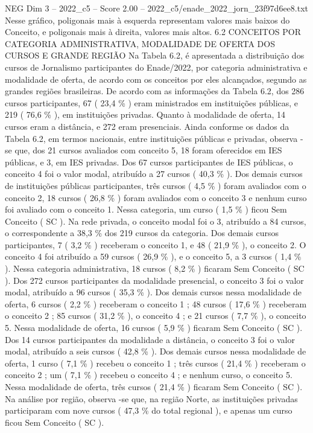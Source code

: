\begin{textsample}{NEG Dim 3 – 2022\_c5 – Score 2.00 – 2022\_c5/enade\_2022\_jorn\_23f97d6ee8.txt}
Nesse gráfico, poligonais mais à esquerda representam valores mais baixos do Conceito, e poligonais mais à direita, valores mais altos. 6.2 CONCEITOS POR CATEGORIA ADMINISTRATIVA, MODALIDADE DE OFERTA DOS CURSOS E GRANDE REGIÃO Na Tabela 6.2, é apresentada a distribuição dos cursos de Jornalismo participantes do Enade/2022, por categoria administrativa e modalidade de oferta, de acordo com os conceitos por eles alcançados, segundo as grandes regiões brasileiras.
De acordo com as informações da Tabela 6.2, dos 286 cursos participantes, 67 ( 23,4 \% ) eram ministrados em instituições públicas, e 219 ( 76,6 \% ), em instituições privadas.
Quanto à modalidade de oferta, 14 cursos eram a distância, e 272 eram presenciais.
Ainda conforme os dados da Tabela 6.2, em termos nacionais, entre instituições públicas e privadas, observa -se que, dos 21 cursos avaliados com conceito 5, 18 foram oferecidos em IES públicas, e 3, em IES privadas.
Dos 67 cursos participantes de IES públicas, o conceito 4 foi o valor modal, atribuído a 27 cursos ( 40,3 \% ).
Dos demais cursos de instituições públicas participantes, três cursos ( 4,5 \% ) foram avaliados com o conceito 2, 18 cursos ( 26,8 \% ) foram avaliados com o conceito 3 e nenhum curso foi avaliado com o conceito 1.
Nessa categoria, um curso ( 1,5 \% ) ficou Sem Conceito ( SC ).
Na rede privada, o conceito modal foi o 3, atribuído a 84 cursos, o correspondente a 38,3 \% dos 219 cursos da categoria.
Dos demais cursos participantes, 7 ( 3,2 \% ) receberam o conceito 1, e 48 ( 21,9 \% ), o conceito 2.
O conceito 4 foi atribuído a 59 cursos ( 26,9 \% ), e o conceito 5, a 3 cursos ( 1,4 \% ).
Nessa categoria administrativa, 18 cursos ( 8,2 \% ) ficaram Sem Conceito ( SC ).
Dos 272 cursos participantes da modalidade presencial, o conceito 3 foi o valor modal, atribuído a 96 cursos ( 35,3 \% ).
Dos demais cursos nessa modalidade de oferta, 6 cursos ( 2,2 \% ) receberam o conceito 1 ; 48 cursos ( 17,6 \% ) receberam o conceito 2 ; 85 cursos ( 31,2 \% ), o conceito 4 ; e 21 cursos ( 7,7 \% ), o conceito 5.
Nessa modalidade de oferta, 16 cursos ( 5,9 \% ) ficaram Sem Conceito ( SC ).
Dos 14 cursos participantes da modalidade a distância, o conceito 3 foi o valor modal, atribuído a seis cursos ( 42,8 \% ).
Dos demais cursos nessa modalidade de oferta, 1 curso ( 7,1 \% ) recebeu o conceito 1 ; três cursos ( 21,4 \% ) receberam o conceito 2 ; um ( 7,1 \% ) recebeu o conceito 4 ; e nenhum curso, o conceito 5.
Nessa modalidade de oferta, três cursos ( 21,4 \% ) ficaram Sem Conceito ( SC ).
Na análise por região, observa -se que, na região Norte, as instituições privadas participaram com nove cursos ( 47,3 \% do total regional ), e apenas um curso ficou Sem Conceito ( SC ).

\end{textsample}
